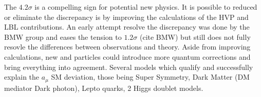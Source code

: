 
The $4.2\sigma$  is a compelling sign for potential new physics. It is possible to reduced or eliminate the discrepancy is by improving the calculations of the HVP and LBL contributions. An early attempt resolve the discrepancy was done by the BMW group and eases the tension  to $1.2\sigma$ (cite BMW) but still does not fully resovle the differences between observations and theory. Aside from improving calculations, new and particles could introduce more quantum corrections and bring everything into agreement. Several models which qualify and successfully explain the $a_\mu$ SM deviation, those being Super Symmetry, Dark Matter (DM mediator Dark photon), Lepto quarks, 2 Higgs doublet models.

